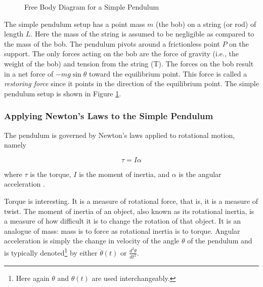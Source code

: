 \documentclass{article}
\theoremstyle{definition}
\begin{document}
\begin{figure}[H]
{
  }                                                                                                             %
 \caption{Free Body Diagram for a Simple Pendulum}
 \label{fig:simple_pendulum}
\end{figure}

\bigskip
\noindent
The simple pendulum setup has a point mass $m$ (the bob) 
on a string (or rod) of length $L$. Here the mass of the string 
is assumed to be negligible as compared  to the mass of the bob. 
The pendulum pivots around a frictionless point $P$ on the support.  
The only forces acting on the bob are the force of gravity 
(i.e., the weight of the bob) and tension from the string (T). 
The forces on the bob result in a net force of $- mg \sin \theta$ 
toward the equilibrium point. This force is called a 
\emph{restoring force} since it points in the direction of the
equilibrium  point. The simple pendulum 
setup is shown in Figure \ref{fig:simple_pendulum}.

\subsubsection{Applying Newton's Laws to the Simple Pendulum}
The pendulum is governed by Newton’s laws applied to 
rotational motion, namely

\begin{equation}
\tau = I \alpha
\label{eqn:tau}
\end{equation}

\bigskip
\noindent
where $\tau$ is the torque, $I$ is the moment of 
inertia, and $\alpha$ is the angular acceleration 
\cite{nave_simple_harmonic_motion}.

\bigskip
\noindent
Torque is interesting. It is a measure of rotational force, that
is, it is a measure of twist. The moment of inertia of an object,
also known as its rotational inertia, is a measure of how
difficult it is to change the rotation of that object. It is an
analogue of mass: mass is to force as rotational inertia is to
torque. Angular acceleration is simply the change in velocity of
the angle $\theta$ of the pendulum and is typically
denoted\footnote{Here again $\theta$ and $\theta(t)$ are used
interchangeably.} by either $\ddot{\theta}(t)$ or
$\frac{d^2 \theta}{dt^2}$. 
\end{document}
